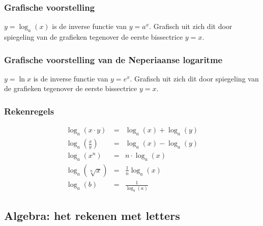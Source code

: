\subsubsection{Grafische voorstelling}

$y=\log_{a}(x)$ is de inverse functie van $y=a^x$. Grafisch uit zich dit door spiegeling van de grafieken tegenover de eerste bissectrice $y=x$.



\begin{figure}
	\centering	
	
\end{figure}
 

\subsubsection{Grafische voorstelling van de Neperiaanse logaritme}

$y=\ln x$ is de inverse functie van $y=e^x$. Grafisch uit zich dit door spiegeling van de grafieken tegenover de eerste bissectrice $y=x$.



\begin{figure}
	\centering	
	
\end{figure}



\subsubsection{Rekenregels}

\begin{ftrekenregel}
	\begin{eqnarray*}
		\log_{a}(x \cdot y) &=& \log_{a}(x) + \log_{a}(y) \\
		\log_{a}(\frac{x}{y}) &=& \log_{a}(x) - \log_{a}(y) \\
		\log_{a}(x^n) &=& n \cdot \log_{a}(x) \\
		\log_{a}(\sqrt[n]{x}) &=& \frac{1}{n}\log_{a}(x) \\
		\log_{a}(b) &=& \frac{1}{\log_{b}(a)} 
	\end{eqnarray*}
\end{ftrekenregel}


\subsection{Algebra: het rekenen met letters}


